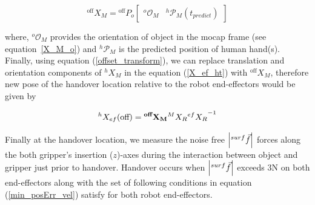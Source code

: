 
\begin{equation}\label{offset_transform}
{}^\text{off}{X}_{M} = 
{}^\text{off}{P}_{o}
 \left[\begin{array}{cc}
{}^{o}\mathcal{O}_M & {}^{h}\mathcal{P}_M(t_{predict})
\end{array}\right]
\end{equation}


where, ${}^{o}\mathcal{O}_M$ provides the orientation of object in the mocap frame (see equation~\ref{X_M_o}) and ${}^{h}\mathcal{P}_M$ is the predicted position of human hand(s). Finally, using equation (\ref{offset_transform}), we can replace translation and orientation components of ${}^{h}{X}_M$ in the equation (\ref{X_ef_ht}) with ${}^\text{off}{X}_{M}$, therefore new pose of the handover location relative to the robot end-effectors would be given by

\begin{equation}
	{}^{h}{X}_{ef}(\text{off}) =  {\bf{}^{\text{\bf off}}{X}_M}  {}^{M}{X}_R {{}^{ef}{X}_R}^{-1}
\end{equation}

Finally at the handover location, we measure the noise free $\abs{{}^{surf}\vec{f}}$ forces along the both gripper's insertion ($z$)-axes during the interaction between object and gripper just prior to handover. Handover occurs when $\abs{{}^{surf}\vec{f}}$ exceeds 3N on both end-effectors along with the set of following conditions in equation (\ref{min_posErr_vel}) satisfy for both robot end-effectors.



